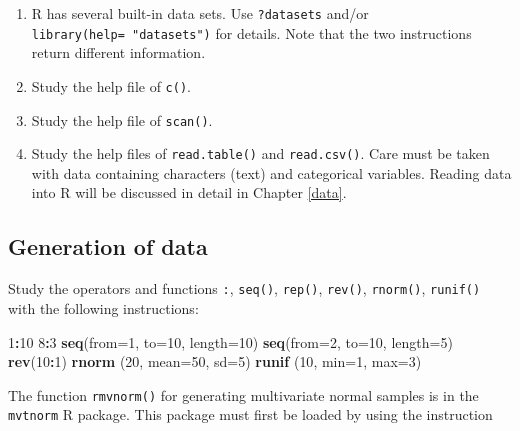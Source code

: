 \documentclass[
]{book}
\newenvironment{Shaded}{\begin{snugshade}}{\end{snugshade}}
\newcommand{\AttributeTok}[1]{\textcolor[rgb]{0.13,0.29,0.53}{#1}}
\newcommand{\DecValTok}[1]{\textcolor[rgb]{0.00,0.00,0.81}{#1}}
\newcommand{\FunctionTok}[1]{\textcolor[rgb]{0.13,0.29,0.53}{\textbf{#1}}}
\newcommand{\NormalTok}[1]{#1}
\newcommand{\SpecialCharTok}[1]{\textcolor[rgb]{0.81,0.36,0.00}{\textbf{#1}}}
\begin{document}
\begin{enumerate}
\def\labelenumi{(\alph{enumi})}
\item
  R has several built-in data sets. Use \texttt{?datasets} and/or \texttt{library(help=\ "datasets")} for details. Note that the two instructions return different information.
\item
  Study the help file of \texttt{c()}.
\item
  Study the help file of \texttt{scan()}.
\item
  Study the help files of \texttt{read.table()} and \texttt{read.csv()}. Care must be taken with data containing characters (text) and categorical variables. Reading data into R will be discussed in detail in Chapter \ref{data}.
\end{enumerate}

\subsection{Generation of data}\label{generation-of-data}

Study the operators and functions \texttt{:}, \texttt{seq()}, \texttt{rep()}, \texttt{rev()}, \texttt{rnorm()}, \texttt{runif()} with the following instructions:

\begin{Shaded}
\begin{Highlighting}[]
\DecValTok{1}\SpecialCharTok{:}\DecValTok{10}
\DecValTok{8}\SpecialCharTok{:}\DecValTok{3}
\FunctionTok{seq}\NormalTok{(}\AttributeTok{from=}\DecValTok{1}\NormalTok{, }\AttributeTok{to=}\DecValTok{10}\NormalTok{, }\AttributeTok{length=}\DecValTok{10}\NormalTok{)}
\FunctionTok{seq}\NormalTok{(}\AttributeTok{from=}\DecValTok{2}\NormalTok{, }\AttributeTok{to=}\DecValTok{10}\NormalTok{, }\AttributeTok{length=}\DecValTok{5}\NormalTok{)}
\FunctionTok{rev}\NormalTok{(}\DecValTok{10}\SpecialCharTok{:}\DecValTok{1}\NormalTok{)}
\FunctionTok{rnorm}\NormalTok{ (}\DecValTok{20}\NormalTok{, }\AttributeTok{mean=}\DecValTok{50}\NormalTok{, }\AttributeTok{sd=}\DecValTok{5}\NormalTok{)}
\FunctionTok{runif}\NormalTok{ (}\DecValTok{10}\NormalTok{, }\AttributeTok{min=}\DecValTok{1}\NormalTok{, }\AttributeTok{max=}\DecValTok{3}\NormalTok{)}
\end{Highlighting}
\end{Shaded}

The function \texttt{rmvnorm()} for generating multivariate normal samples is in the \texttt{mvtnorm} R package. This package must first be loaded by using the instruction
\end{document}
